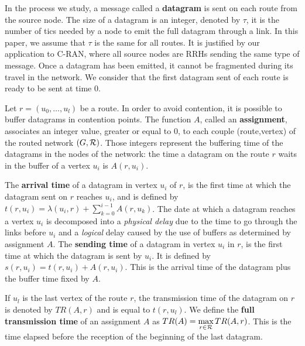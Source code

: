 \documentclass[english]{article}
\begin{document}
        In the process we study, a message called a {\bf datagram} is sent on each route from the source node. The size of a datagram is an integer, denoted by $\tau$, it is the number of tics needed by a node to emit the full datagram through a link.  In this paper, we assume that $\tau$ is the same for all routes. It is justified by our application to C-RAN, where all source nodes are RRHs sending the same type of message. Once a datagram has been emitted, it cannot be fragmented during its travel in the network. We consider that the first datagram sent of each route is ready to be sent at time $0$.

          Let $r=(u_0,\dots,u_l)$ be a route. In order to avoid contention, it is possible to buffer datagrams in contention points. The function $A$, called an \textbf{assignment}, associates an integer value, greater or equal to $0$, to each couple (route,vertex) of the routed network $(G,{\cal R})$. Those integers represent the buffering time of the datagrams in the nodes of the network: the time a datagram on the route $r$ waits in the buffer of a vertex $u_i$ is $A(r,u_i)$.
          
       

 The \textbf{arrival time} of a datagram in vertex $u_i$ of $r$, is the first time at which the datagram sent on $r$ reaches $u_i$, and is defined by $t(r,u_i) = \lambda(u_i,r) + \sum_{k=0}^{i-1} A(r,u_k) $. The date at which a datagram reaches a vertex $u_i$ is decomposed into a \emph{physical delay} due to the time to go through the links before $u_i$ and a \emph{logical} delay caused by the use of buffers as determined by assignment $A$.
  The \textbf{sending time} of a datagram in vertex $u_i$ in $r$, is the first time at which the datagram is sent by $u_i$. It is defined by $s(r,u_i) = t(r,u_i) +  A(r,u_i) $. This is the arrival time of the datagram plus the buffer time fixed by $A$.
 
  If $u_l$ is the last vertex of the route $r$, the transmission time of the datagram on 
  $r$ is denoted by $TR(A,r)$ and is equal to $t(r,u_l)$. We define the \textbf{full transmission time} of an assignment $A$ as $TR(A) = \displaystyle \max\limits_{r \in {\cal R}} TR(A,r) $. This is the time elapsed before the reception of the beginning of the last datagram. 
         
\end{document}
